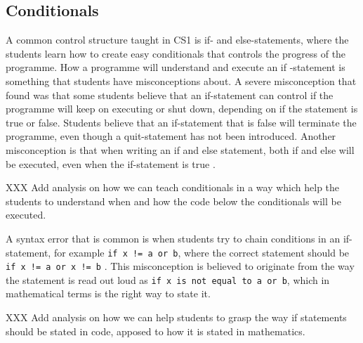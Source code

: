 \subsection{Conditionals}

A common control structure taught in CS1 is if- and else-statements, where 
the students learn how to create easy conditionals that controls the 
progress of the programme. How a programme will understand and execute an if
-statement is something that students have misconceptions about. A severe 
misconception that \textcite{Plass2015Variables} found was that some 
students believe that an if-statement can control if the programme will 
keep on executing or shut down, depending on if the statement is true or 
false. Students believe that an if-statement that is false will terminate 
the programme, even though a quit-statement has not been introduced. 
Another misconception is that when writing an if and else statement, both 
if and else will be executed, even when the if-statement is true \parencite{
MisconceptionsSurvey2017}.

XXX Add analysis on how we can teach conditionals in a way which help the 
students to understand when and how the code below the conditionals will be 
executed.

A syntax error that is common is when students try to chain conditions in 
an if-statement, for example \verb'if x != a or b', where the correct 
statement should be \verb'if x != a or x != b' \parencite{GuoMarkelZhang2020
}. This misconception is believed to originate from the way the statement 
is read out loud as \verb'if x is not equal to a or b', which in 
mathematical terms is the right way to state it. 

XXX Add analysis on how we can help students to grasp the way if statements 
should be stated in code, apposed to how it is stated in mathematics. 